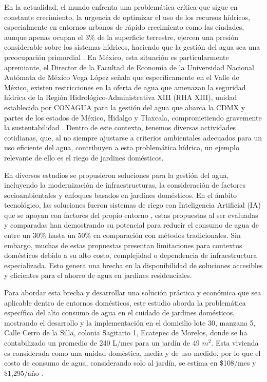 \documentclass[pdflatex,sn-mathphys-num]{sn-jnl}%
\theoremstyle{thmstyleone}%
\theoremstyle{thmstyletwo}%
\theoremstyle{thmstylethree}%
\begin{document}
\begin{multicols}{2}
\justifying
En la actualidad, el mundo enfrenta una problemática crítica que sigue en constante crecimiento, la urgencia de optimizar el uso de los recursos hídricos, especialmente en entornos urbanos de rápido crecimiento como las ciudades, aunque apenas ocupan el 3\% de la superficie terrestre, ejercen una presión considerable sobre los sistemas hídricos, haciendo que la gestión del agua sea una preocupación primordial \cite{ref1}. En México, esta situación es particularmente apremiante, el Director de la Facultad de Economía de la Universidad Nacional Autómata de México Vega López señala que específicamente en el Valle de México, existen restricciones en la oferta de agua que amenazan la seguridad hídrica de la Región Hidrológico-Administrativa XIII (RHA XIII), unidad establecida por CONAGUA para la gestión del agua que abarca la CDMX y partes de los estados de México, Hidalgo y Tlaxcala, comprometiendo gravemente la sustentabilidad \cite{ref2}. Dentro de este contexto, tenemos diversas actividades cotidianas, que, al no siempre ajustarse a criterios ambientales adecuados para un uso eficiente del agua, contribuyen a esta problemática hídrica, un ejemplo relevante de ello es el riego de jardines domésticos.

En diversos estudios se propusieron soluciones para la gestión del agua, incluyendo la modernización de infraestructuras, la consideración de factores socioambientales y enfoques basados en jardínes domésticos. En el ámbito tecnológico, las soluciones fueron sistemas de riego con Inteligencia Artificial (IA) que se apoyan con factores del propio entorno \cite{ref3}, estas propuestas al ser evaluadas y comparadas han demostrando su potencial para reducir el consumo de agua de entre un 30\% hasta un 50\% en comparación con métodos tradicionales. Sin embargo, muchas de estas propuestas presentan limitaciones para contextos domésticos debido a su alto costo, complejidad o dependencia de infraestructura especializada. Esto genera una brecha en la disponibilidad de soluciones accesibles y eficientes para el ahorro de agua en jardines residenciales.

Para abordar esta brecha y desarrollar una solución práctica y económica que sea aplicable dentro de entornos domésticos, este estudio aborda la problemática específica del alto consumo de agua en el cuidado de jardines domésticos, mostrando el desarrollo y la implementación en el domicilio lote 30, manzana 5, Calle Cerro de la Silla, colonia Sagitario 1, Ecatepec de Morelos, donde se ha contabilizado un promedio de 240 L/mes para un jardín de 49 $m^2$. Esta vivienda es considerada como una unidad doméstica, media y de uso medido, por lo que el costo de consumo de agua, considerando solo al jardín, se estima en \$108/mes y \$1,295/año \cite{ref4}.


\end{multicols}
\end{document}
